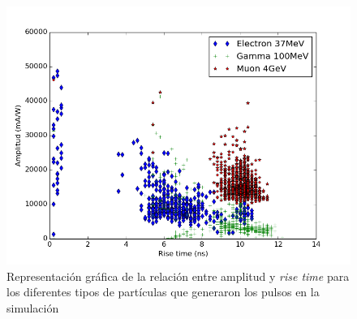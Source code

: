 \documentclass{book}
\begin{document}
\begin{figure}[h] %
\begin{center}
 \includegraphics[width=0.8\linewidth]{RiseTimeAmp.png}
\caption{Representaci\'on gr\'afica de la relaci\'on entre amplitud y \textit{rise time} para los diferentes tipos de part\'iculas que generaron los pulsos en la simulaci\'on}
\end{center}
\end{figure}



\end{document}
